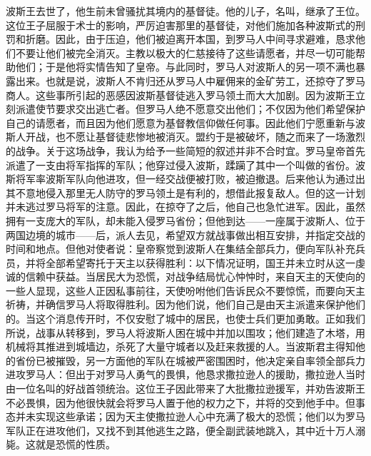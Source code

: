 波斯王去世了，他生前未曾骚扰其境内的基督徒。他的儿子，名叫，继承了王位。这位王子屈服于术士的影响，严厉迫害那里的基督徒，对他们施加各种波斯式的刑罚和折磨。因此，由于压迫，他们被迫离开本国，到罗马人中间寻求避难，恳求他们不要让他们被完全消灭。主教以极大的仁慈接待了这些请愿者，并尽一切可能帮助他们；于是他将实情告知了皇帝。与此同时，罗马人对波斯人的另一项不满也暴露出来。也就是说，波斯人不肯归还从罗马人中雇佣来的金矿劳工，还掠夺了罗马商人。这些事所引起的恶感因波斯基督徒逃入罗马领土而大大加剧。因为波斯王立刻派遣使节要求交出逃亡者。但罗马人绝不愿意交出他们；不仅因为他们希望保护自己的请愿者，而且因为他们愿意为基督教信仰做任何事。因此他们宁愿重新与波斯人开战，也不愿让基督徒悲惨地被消灭。盟约于是被破坏，随之而来了一场激烈的战争。关于这场战争，我认为给予一些简短的叙述并非不合时宜。罗马皇帝首先派遣了一支由将军指挥的军队；他穿过侵入波斯，蹂躏了其中一个叫做的省份。波斯将军率波斯军队向他进攻，但一经交战便被打败，被迫撤退。后来他认为通过出其不意地侵入那里无人防守的罗马领土是有利的，想借此报复敌人。但的这一计划并未逃过罗马将军的注意。因此，在掠夺了之后，他自己也急忙进军。因此，虽然拥有一支庞大的军队，却未能入侵罗马省份；但他到达——一座属于波斯人、位于两国边境的城市——后，派人去见，希望双方就战事做出相互安排，并指定交战的时间和地点。但他对使者说：皇帝察觉到波斯人在集结全部兵力，便向军队补充兵员，并将全部希望寄托于天主以获得胜利：以下情况证明，国王并未立时从这一虔诚的信赖中获益。当居民大为恐慌，对战争结局忧心忡忡时，来自天主的天使向的一些人显现，这些人正因私事前往，天使吩咐他们告诉民众不要惊慌，而要向天主祈祷，并确信罗马人将取得胜利。因为他们说，他们自己是由天主派遣来保护他们的。当这个消息传开时，不仅安慰了城中的居民，也使士兵们更加勇敢。正如我们所说，战事从转移到，罗马人将波斯人困在城中并加以围攻；他们建造了木塔，用机械将其推进到城墙边，杀死了大量守城者以及赶来救援的人。当波斯君主得知他的省份已被摧毁，另一方面他的军队在城被严密围困时，他决定亲自率领全部兵力进攻罗马人：但出于对罗马人勇气的畏惧，他恳求撒拉逊人的援助，撒拉逊人当时由一位名叫的好战首领统治。这位王子因此带来了大批撒拉逊援军，并劝告波斯王不必畏惧，因为他很快就会将罗马人置于他的权力之下，并将的交到他手中。但事态并未实现这些承诺；因为天主使撒拉逊人心中充满了极大的恐慌；他们以为罗马军队正在进攻他们，又找不到其他逃生之路，便全副武装地跳入，其中近十万人溺毙。这就是恐慌的性质。\par

